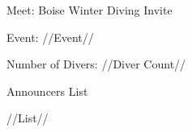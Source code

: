 \documentclass[12pt, letterpaper, portrait]{article}
\begin{document}
    Meet: Boise Winter Diving Invite
    
    Event: //Event//

	Number of Divers: //Diver Count//
	\begin{center}
		Announcers List
    \end{center}

    //List//
\end{document}
